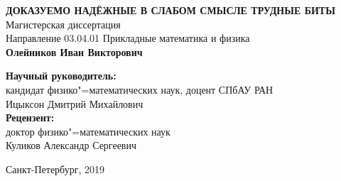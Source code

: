 \begin{titlepage}

\begin{center}
\end{center}

\vspace{2cm}
\begin{center}
  \MakeUppercase{\textbf{Доказуемо надёжные в слабом смысле трудные биты}}
  \\
  Магистерская диссертация
  \\[1cm]
  Направление 03.04.01 Прикладные математика и физика
  \\[1cm]
  {\fontsize{18}{21.6}\selectfont
    \textbf{Олейников Иван Викторович}
  }
  \\[2cm]
\end{center}

\hfill
\begin{minipage}{0.6\textwidth}
\textbf{Научный руководитель:} \\
кандидат физико"=математических наук, доцент СПбАУ РАН \\
Ицыксон Дмитрий Михайлович \\[0.5cm]
\textbf{Рецензент:} \\
доктор физико"=математических наук \\
Куликов Александр Сергеевич
\end{minipage}

\begin{center}
\mbox{}
\vfill
Санкт-Петербург, 2019
\end{center}

\end{titlepage}
\newpage
